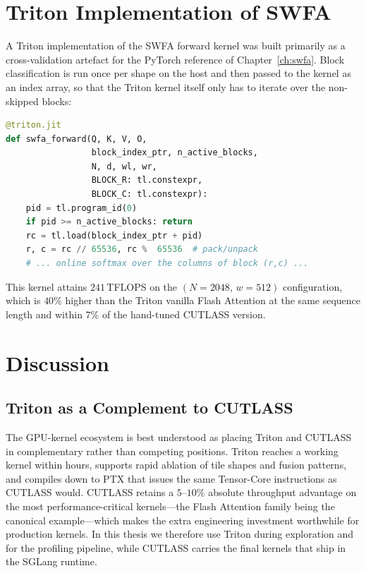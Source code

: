 \section{Triton Implementation of
SWFA}\label{sec:triton_swfa}
A Triton implementation of the SWFA forward kernel was built
primarily as a cross-validation artefact for the PyTorch
reference of Chapter~\ref{ch:swfa}. Block classification is run
once per shape on the host and then passed to the kernel as an
index array, so that the Triton kernel itself only has to iterate
over the non-skipped blocks:

\begin{lstlisting}[language=Python,basicstyle=\ttfamily\scriptsize]
@triton.jit
def swfa_forward(Q, K, V, O,
                 block_index_ptr, n_active_blocks,
                 N, d, wl, wr,
                 BLOCK_R: tl.constexpr,
                 BLOCK_C: tl.constexpr):
    pid = tl.program_id(0)
    if pid >= n_active_blocks: return
    rc = tl.load(block_index_ptr + pid)
    r, c = rc // 65536, rc %  65536  # pack/unpack
    # ... online softmax over the columns of block (r,c) ...
\end{lstlisting}
This kernel attains $241$\,TFLOPS on the
$(N = 2048,\, w = 512)$ configuration, which is $40\%$ higher
than the Triton vanilla Flash Attention at the same sequence
length and within $7\%$ of the hand-tuned CUTLASS version.

\section{Discussion}\label{sec:triton_discussion}

\subsection{Triton as a Complement to
CUTLASS}\label{sec:triton_complement}
The GPU-kernel ecosystem is best understood as placing Triton and
CUTLASS in complementary rather than competing positions. Triton
reaches a working kernel within hours, supports rapid ablation of
tile shapes and fusion patterns, and compiles down to PTX that
issues the same Tensor-Core instructions as CUTLASS would. CUTLASS
retains a $5$--$10\%$ absolute throughput advantage on the most
performance-critical kernels---the Flash Attention family being
the canonical example---which makes the extra engineering
investment worthwhile for production kernels. In this thesis we
therefore use Triton during exploration and for the profiling
pipeline, while CUTLASS carries the final kernels that ship in
the SGLang runtime.

